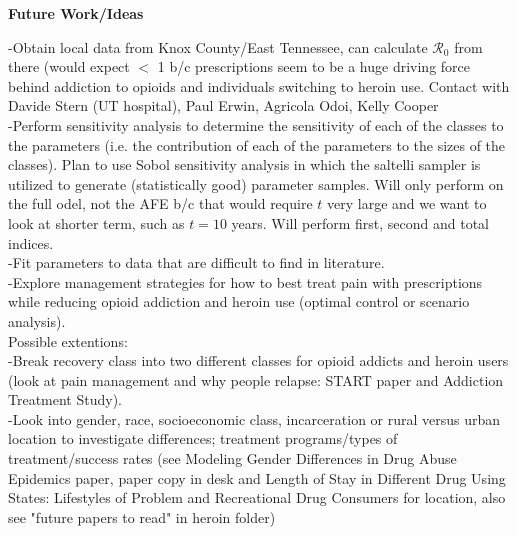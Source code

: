 \documentclass[12pt]{article}
\begin{document}

\textbf{Future Work/Ideas} 


-Obtain local data from Knox County/East Tennessee, can calculate $\mathscr{R}_0$ from there (would expect $<$ 1 b/c prescriptions seem to be a huge driving force behind addiction to opioids and individuals switching to heroin use. Contact with Davide Stern (UT hospital), Paul Erwin, Agricola Odoi, Kelly Cooper\\
-Perform sensitivity analysis to determine the sensitivity of each of the classes to the parameters (i.e. the contribution of each of the parameters to the sizes of the classes). Plan to use Sobol sensitivity analysis in which the saltelli sampler is utilized to generate (statistically good) parameter samples. Will only perform on the full  odel, not the AFE b/c that would require $t$ very large and we want to look at shorter term, such as $t=10$ years. Will perform first, second and total indices. \\
-Fit parameters to data that are difficult to find in literature. \\
-Explore management strategies for how to best treat pain with prescriptions while reducing opioid addiction and heroin use (optimal control or scenario analysis).  \\
Possible extentions: \\
-Break recovery class into two different classes for opioid addicts and heroin users (look at pain management and why people relapse: START paper and Addiction Treatment Study). \\
-Look into gender, race, socioeconomic class, incarceration or rural versus urban location to investigate differences; treatment programs/types of treatment/success rates (see Modeling Gender Differences in Drug Abuse Epidemics paper, paper copy in desk and Length of Stay in Different Drug Using States: Lifestyles of Problem and Recreational Drug Consumers for location, also see "future papers to read" in heroin folder)%
\end{document}
